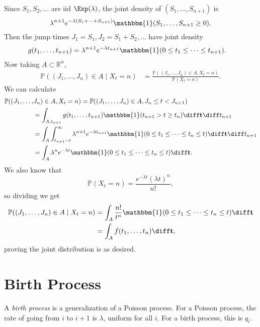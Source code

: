 \documentclass[12pt]{article}
\begin{document}
\begin{proofbox}
	Since $S_1, S_2, \ldots$ are iid $\Exp(\lambda)$, the joint density of $(S_1, \ldots, S_{n+1})$ is
	\[
		\lambda^{n+1}e^{-\lambda(S_1 + \cdots + S_{n+1})} \mathbbm{1} (S_1, \ldots, S_{n+1} \geq 0)
	.\]
	Then the jump times $J_1 = S_1, J_2 = S_1 + S_2, \ldots$ have joint density
	\begin{align*}
		g(t_1,\ldots,t_{n+1})&= \lambda^{n+1}e^{-\lambda t_{n+1}}\mathbbm{1}(0 \leq t_1 \leq \cdots \leq t_{n+1}).
	\end{align*}
	Now taking $A \subset \mathbb{R}^{n}$,
	\begin{align*}
		\mathbb{P}((J_1, \ldots, J_n) \in A \mid X_t = n) &= \frac{\mathbb{P}((J_1, \ldots, J_n) \in A, X_t = n)}{\mathbb{P}(X_t = n)}.
	\end{align*}
	We can calculate
	\begin{align*}
		\mathbb{P}((J_1, \ldots, &J_n) \in A, X_t = n) = \mathbb{P}((J_1, \ldots, J_n) \in A, J_n \leq t < J_{n+1}) \\
							      &= \int_{A, t_{n+1}}g(t_1, \ldots, t_{n+1}) \mathbbm{1}(t_{n+1} > t \geq t_n) \diff \mathbf{t} \diff t_{n+1} \\
							      &= \int_{A} \int_{t_{n+1} = t}^{\infty} \lambda^{n+1} e^{-\lambda t_{n+1}} \mathbbm{1}(0 \leq t_1 \leq \cdots \leq t_n \leq t) \diff \mathbf{t} \diff t_{n+1} \\
							      &= \int_{A} \lambda^{n} e^{-\lambda t} \mathbbm{1} (0 \leq t_1 \leq \cdots \leq t_n \leq t) \diff \mathbf{t}.
	\end{align*}
	We also know that
	\[
	\mathbb{P}(X_t = n) = \frac{e^{-\lambda t} (\lambda t)^{n}}{n!}
	,\]
	so dividing we get
	\begin{align*}
		\mathbb{P}((J_1, \ldots, J_n) \in A \mid X_t = n) &= \int_{A} \frac{n!}{t^{n}} \mathbbm{1} (0 \leq t_1 \leq \cdots \leq t_n \leq t) \diff \mathbf{t} \\
								  &= \int_{A} f(t_1, \ldots, t_n) \diff \mathbf{t},
	\end{align*}
	proving the joint distribution is as desired.
\end{proofbox}

\newpage

\section{Birth Process}
\label{sec:birth_process}

A \emph{birth process} is a generalization of a Poisson process. For a Poisson process, the rate of going from $i$ to $i + 1$ is $\lambda$, uniform for all $i$. For a birth process, this is $q_i$.
\end{document}

